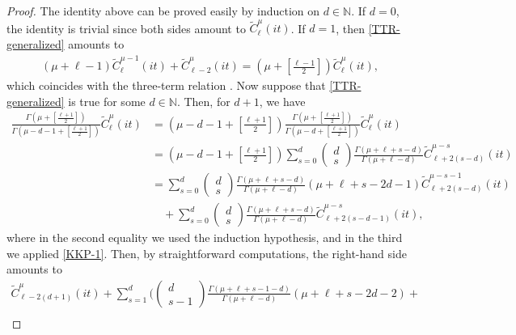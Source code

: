 \documentclass[12pt, pdflatex, a4paper]{article}
\theoremstyle{plain}
\theoremstyle{definition}
\def\Geg{\widetilde{C}}
\def\N{{\mathbb N}}
\begin{document}
\begin{proof}
The identity above can be proved easily by induction on $d\in \N$. If $d = 0$, the identity is trivial since both sides amount to $\Geg_{\ell}^\mu(it)$. If $d = 1$, then \eqref{TTR-generalized} amounts to
\begin{align}
\label{KKP-1}
(\mu + \ell-1)\Geg_\ell^{\mu-1}(it) + \Geg_{\ell-2}^{\mu}(it) = \left(\mu + \left[\frac{\ell-1}{2}\right]\right)\Geg_\ell^{\mu}(it),
\end{align}
which coincides with the three-term relation \cite[Eq. (14.15)]{KKP16}.
Now suppose that \eqref{TTR-generalized} is true for some $d\in \N$. Then, for $d+1$, we have
\begin{align*}
\frac{\Gamma\left(\mu+ \left[\frac{\ell+1}{2}\right]\right)}{\Gamma\left(\mu - d -1 + \left[\frac{\ell+1}{2}\right]\right)}
\Geg_\ell^\mu(it) &= \left(\mu - d -1 + \left[\frac{\ell+1}{2}\right]\right)\frac{\Gamma\left(\mu+ \left[\frac{\ell+1}{2}\right]\right)}{\Gamma\left(\mu - d + \left[\frac{\ell+1}{2}\right]\right)}\Geg_\ell^\mu(it)\\
&= \left(\mu - d -1 + \left[\frac{\ell+1}{2}\right]\right)\sum_{s=0}^{d}
\begin{pmatrix}
d\\
s
\end{pmatrix}
\frac{\Gamma\left(\mu+\ell+s-d\right)}{\Gamma\left(\mu+\ell-d\right)}\Geg_{\ell+2(s-d)}^{\mu-s}(it)\\
&= 
\sum_{s=0}^{d}
\begin{pmatrix}
d\\
s
\end{pmatrix}
\frac{\Gamma\left(\mu+\ell+s-d\right)}{\Gamma\left(\mu+\ell-d\right)}(\mu+\ell+s-2d-1)\Geg_{\ell+2(s-d)}^{\mu-s-1}(it)\\
& \quad +\sum_{s=0}^{d}
\begin{pmatrix}
d\\
s
\end{pmatrix}
\frac{\Gamma\left(\mu+\ell+s-d\right)}{\Gamma\left(\mu+\ell-d\right)}\Geg_{\ell+2(s-d-1)}^{\mu-s}(it),
\end{align*}
where in the second equality we used the induction hypothesis,  and in the third we applied \eqref{KKP-1}. Then, by straightforward computations, the right-hand side amounts to
\begin{align*}
\Geg_{\ell-2(d+1)}^\mu(it) + 
\sum_{s=1}^{d}\Bigg(
\begin{pmatrix}
d\\
s-1
\end{pmatrix}
\frac{\Gamma\left(\mu+\ell+s-1-d\right)}{\Gamma\left(\mu+\ell-d\right)}(\mu+\ell+s-2d-2) +\\

\end{align*}
\end{proof}
\end{document}
